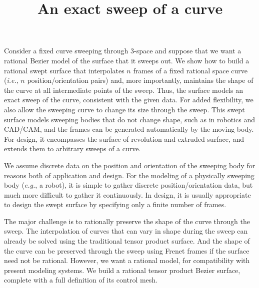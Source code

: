 
 
\title{An exact sweep of a curve}

Consider a fixed curve sweeping through 3-space and suppose
that we want a rational Bezier model of the surface that it sweeps out.
We show how to build a rational swept surface that
interpolates $n$ frames of a fixed rational space curve 
({\em i.e.}, $n$ position/orientation pairs) 
and, more importantly, 
maintains the shape of the curve at all intermediate points of the sweep.
Thus, the surface models 
an exact sweep of the curve, consistent with the given data.
For added flexibility, we also allow the sweeping curve to change its
size through the sweep.
This swept surface models sweeping bodies that do not change shape,
such as in robotics and CAD/CAM,
and the frames can be generated automatically by the moving body.
For design, it encompasses the surface of revolution 
and extruded surface, and extends them to arbitrary sweeps of a curve.

We assume discrete data on the position and orientation
of the sweeping body for reasons both of application and design.
For the modeling of a physically sweeping body ({\em e.g.}, a robot), 
it is simple to gather discrete position/orientation data, 
but much more difficult to gather it continuously.
In design, it is usually appropriate to design the swept surface
by specifying only a finite number of frames.

The major challenge is to rationally preserve the shape of the curve 
through the sweep.
The interpolation of curves that can vary in shape during the sweep
can already be solved using the traditional tensor product surface.
And the shape of the curve can be preserved through the sweep
using Frenet frames if the surface need not be rational.
However, we want a rational model, for compatibility with 
present modeling systems.
We build a rational tensor product Bezier surface, complete with a full
definition of its control mesh.

